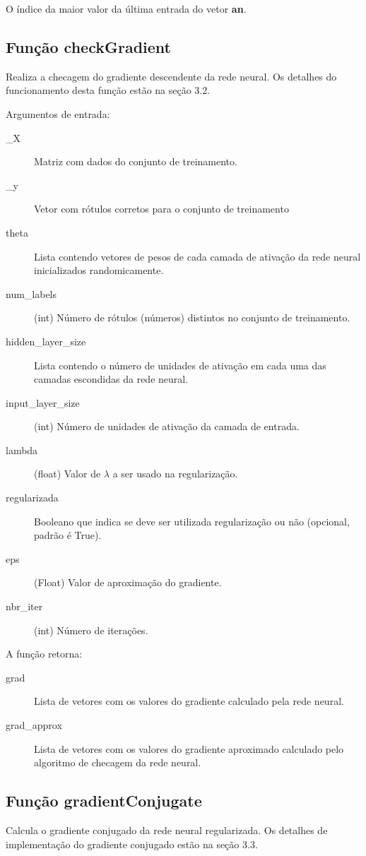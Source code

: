 \documentclass[12pt]{article}
\begin{document}
O  índice da maior valor da última entrada do vetor \textbf{an}.
\subsection{Função checkGradient}

Realiza a checagem do gradiente descendente da rede neural. Os detalhes do funcionamento desta função estão na seção 3.2.

Argumentos de entrada:
\begin{description} 

\item[\_X] Matriz com dados do conjunto de treinamento.
\item[\_y] Vetor com rótulos corretos para o conjunto de treinamento
\item[theta] Lista contendo vetores de pesos de cada camada de ativação da rede neural inicializados randomicamente.
\item[num\_labels] (int) Número de rótulos (números) distintos no conjunto de treinamento.
\item[hidden\_layer\_size] Lista contendo o número de unidades de ativação em cada uma das camadas escondidas da rede neural.
\item[input\_layer\_size] (int) Número de unidades de ativação da camada de entrada.
\item[lambda] (float) Valor de $\lambda$ a ser usado na regularização.
\item[regularizada] Booleano que indica se deve ser utilizada regularização ou não (opcional, padrão é True).
\item[eps] (Float) Valor de aproximação do gradiente.
\item[nbr\_iter] (int) Número de iterações.
\end{description}
A função retorna: 
\begin{description}
\item[grad] Lista de vetores com os valores do gradiente calculado pela rede neural.
\item[grad\_approx] Lista de vetores com os valores do gradiente aproximado calculado pelo algoritmo de checagem da rede neural.
\end{description}

\subsection{Função gradientConjugate}

Calcula o gradiente conjugado da rede neural regularizada. Os detalhes de implementação do gradiente conjugado estão na seção 3.3.
\end{document}
